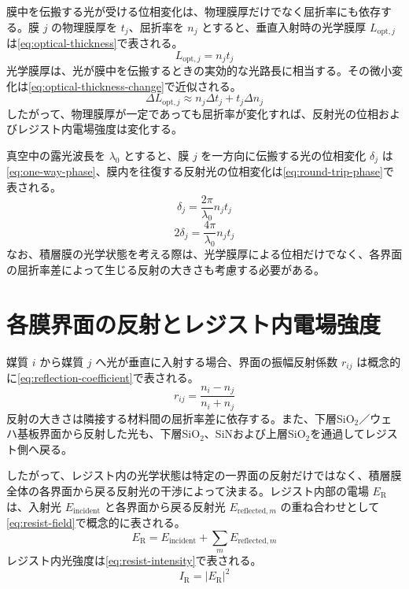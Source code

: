\documentclass[11pt,a4paper]{ltjsarticle}
\begin{document}
膜中を伝搬する光が受ける位相変化は、物理膜厚だけでなく屈折率にも依存する\cite{macleod2010}。膜 $j$ の物理膜厚を $t_j$、屈折率を $n_j$ とすると、垂直入射時の光学膜厚 $L_{\mathrm{opt},j}$ は\cref{eq:optical-thickness}で表される。
\begin{equation}
  L_{\mathrm{opt},j}=n_jt_j
  \label{eq:optical-thickness}
\end{equation}
光学膜厚は、光が膜中を伝搬するときの実効的な光路長に相当する。その微小変化は\cref{eq:optical-thickness-change}で近似される。
\begin{equation}
  \Delta L_{\mathrm{opt},j}
  \approx n_j\Delta t_j+t_j\Delta n_j
  \label{eq:optical-thickness-change}
\end{equation}
したがって、物理膜厚が一定であっても屈折率が変化すれば、反射光の位相およびレジスト内電場強度は変化する。

真空中の露光波長を $\lambda_0$ とすると、膜 $j$ を一方向に伝搬する光の位相変化 $\delta_j$ は\cref{eq:one-way-phase}、膜内を往復する反射光の位相変化は\cref{eq:round-trip-phase}で表される。
\begin{equation}
  \delta_j=\frac{2\pi}{\lambda_0}n_jt_j
  \label{eq:one-way-phase}
\end{equation}
\begin{equation}
  2\delta_j=\frac{4\pi}{\lambda_0}n_jt_j
  \label{eq:round-trip-phase}
\end{equation}
なお、積層膜の光学状態を考える際は、光学膜厚による位相だけでなく、各界面の屈折率差によって生じる反射の大きさも考慮する必要がある。


\section{各膜界面の反射とレジスト内電場強度}
\label{sec:interface-reflection}

媒質 $i$ から媒質 $j$ へ光が垂直に入射する場合、界面の振幅反射係数 $r_{ij}$ は概念的に\cref{eq:reflection-coefficient}で表される。
\begin{equation}
  r_{ij}=\frac{n_i-n_j}{n_i+n_j}
  \label{eq:reflection-coefficient}
\end{equation}
反射の大きさは隣接する材料間の屈折率差に依存する。また、下層SiO$_2$／ウェハ基板界面から反射した光も、下層SiO$_2$、SiNおよび上層SiO$_2$を通過してレジスト側へ戻る。

したがって、レジスト内の光学状態は特定の一界面の反射だけではなく、積層膜全体の各界面から戻る反射光の干渉によって決まる。レジスト内部の電場 $E_{\mathrm{R}}$ は、入射光 $E_{\mathrm{incident}}$ と各界面から戻る反射光 $E_{\mathrm{reflected},m}$ の重ね合わせとして\cref{eq:resist-field}で概念的に表される。
\begin{equation}
  E_{\mathrm{R}}
  =E_{\mathrm{incident}}
  +\sum_m E_{\mathrm{reflected},m}
  \label{eq:resist-field}
\end{equation}
レジスト内光強度は\cref{eq:resist-intensity}で表される。
\begin{equation}
  I_{\mathrm{R}}=\lvert E_{\mathrm{R}}\rvert^2
  \label{eq:resist-intensity}
\end{equation}
\end{document}

